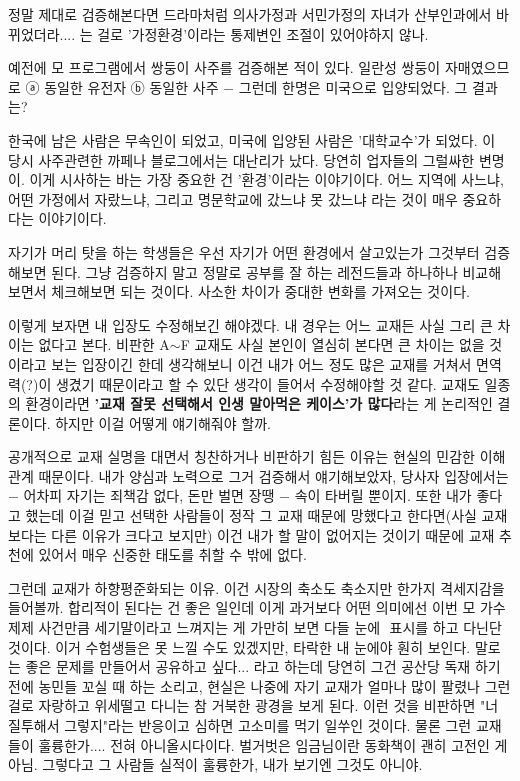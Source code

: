 정말 제대로 검증해본다면 드라마처럼 의사가정과 서민가정의 자녀가 산부인과에서 바뀌었더라.... 는 걸로
'가정환경'이라는 통제변인 조절이 있어야하지 않나.
\vspace{5mm}

예전에 모 프로그램에서 쌍둥이 사주를 검증해본 적이 있다.
일란성 쌍둥이 자매였으므로 ⓐ 동일한 유전자 ⓑ 동일한 사주 $-$ 그런데 한명은 미국으로 입양되었다.
그 결과는?
\vspace{5mm}

한국에 남은 사람은 무속인이 되었고, 미국에 입양된 사람은 '대학교수'가 되었다.
이 당시 사주관련한 까페나 블로그에서는 대난리가 났다. 당연히 업자들의 그럴싸한 변명이.
이게 시사하는 바는 가장 중요한 건 '환경'이라는 이야기이다.
어느 지역에 사느냐, 어떤 가정에서 자랐느냐, 그리고 명문학교에 갔느냐 못 갔느냐 라는 것이 매우 중요하다는 이야기이다.
\vspace{5mm}

자기가 머리 탓을 하는 학생들은 우선 자기가 어떤 환경에서 살고있는가 그것부터 검증해보면 된다.
그냥 검증하지 말고 정말로 공부를 잘 하는 레전드들과 하나하나 비교해보면서 체크해보면 되는 것이다.
사소한 차이가 중대한 변화를 가져오는 것이다.
\vspace{5mm}

이렇게 보자면 내 입장도 수정해보긴 해야겠다. 내 경우는 어느 교재든 사실 그리 큰 차이는 없다고 본다.
비판한 A$\sim$F 교재도 사실 본인이 열심히 본다면 큰 차이는 없을 것이라고 보는 입장이긴 한데
생각해보니 이건 내가 어느 정도 많은 교재를 거쳐서 면역력(?)이 생겼기 때문이라고 할 수 있단 생각이 들어서 수정해야할 것 같다.
교재도 일종의 환경이라면 \textbf{'교재 잘못 선택해서 인생 말아먹은 케이스'가 많다}라는 게 논리적인 결론이다.
하지만 이걸 어떻게 얘기해줘야 할까.
\vspace{5mm}

공개적으로 교재 실명을 대면서 칭찬하거나 비판하기 힘든 이유는 현실의 민감한 이해관계 때문이다.
내가 양심과 노력으로 그거 검증해서 얘기해보았자, 당사자 입장에서는 $-$ 어차피 자기는 죄책감 없다, 돈만 벌면 장땡 $-$ 속이 타버릴 뿐이지.
또한 내가 좋다고 했는데 이걸 믿고 선택한 사람들이 정작 그 교재 때문에 망했다고 한다면(사실 교재보다는 다른 이유가 크다고 보지만)
이건 내가 할 말이 없어지는 것이기 때문에 교재 추천에 있어서 매우 신중한 태도를 취할 수 밖에 없다.
\vspace{5mm}

그런데 교재가 하향평준화되는 이유. 이건 시장의 축소도 축소지만 한가지 격세지감을 들어볼까.
합리적이 된다는 건 좋은 일인데 이게 과거보다 어떤 의미에선 이번 모 가수 제제 사건만큼 세기말이라고 느껴지는 게
가만히 보면 다들 눈에 $ $ 표시를 하고 다닌단 것이다.
이거 수험생들은 못 느낄 수도 있겠지만, 타락한 내 눈에야 훤히 보인다.
말로는 좋은 문제를 만들어서 공유하고 싶다... 라고 하는데 당연히 그건 공산당 독재 하기 전에 농민들 꼬실 때 하는 소리고,
현실은 나중에 자기 교재가 얼마나 많이 팔렸나 그런 걸로 자랑하고 위세떨고 다니는 참 거북한 광경을 보게 된다.
이런 것을 비판하면 "너 질투해서 그렇지"라는 반응이고 심하면 고소미를 먹기 일쑤인 것이다.
물론 그런 교재들이 훌륭한가.... 전혀 아니올시다이다. 벌거벗은 임금님이란 동화책이 괜히 고전인 게 아님.
그렇다고 그 사람들 실적이 훌륭한가, 내가 보기엔 그것도 아니야.
\vspace{5mm}

